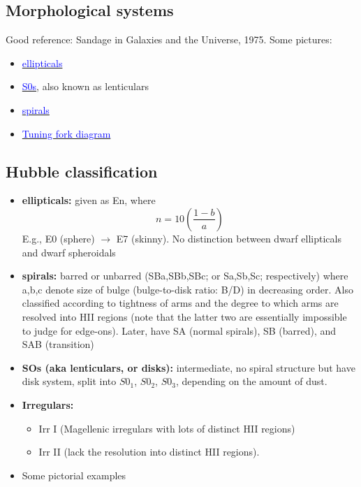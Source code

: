\documentclass{article}
\begin{document}
\subsection{Morphological systems}
Good reference: Sandage in Galaxies and the Universe, 1975.
Some pictures:
\begin{itemize}
    \item \href{http://astronomy.nmsu.edu/holtz/a555/html/diagrams/a616/ellips.htm}
        {\textcolor{blue}{ellipticals}}
    \item \href{http://astronomy.nmsu.edu/holtz/a555/html/diagrams/a616/s0.htm}
        {\textcolor{blue}{S0s}}, also known as lenticulars
    \item \href{http://astronomy.nmsu.edu/holtz/a555/html/diagrams/a616/spirals.htm}
        {\textcolor{blue}{spirals}}
    \item \href{http://astronomy.as.virginia.edu}
        {\textcolor{blue}{Tuning fork diagram}}
\end{itemize}

\subsection{Hubble classification}
\begin{itemize}
    \item \textbf{ellipticals:} given as En, where
        \[
            n = 10(\frac{1-b}{a})
        \]
        E.g., E0 (sphere) $\rightarrow$ E7 (skinny).
        No distinction between dwarf ellipticals and dwarf spheroidals
    \item \textbf{spirals:} barred or unbarred (SBa,SBb,SBc; or Sa,Sb,Sc;
        respectively)
        where a,b,c denote size of bulge (bulge-to-disk ratio: B/D)
        in decreasing order. Also classified according to tightness of
        arms and the degree to which arms are resolved into HII regions
        (note that the latter two are essentially impossible to judge
        for edge-ons).
        Later, have SA (normal spirals), SB (barred), and SAB (transition)
    \item \textbf{SOs (aka lenticulars, or disks):} intermediate, no spiral
        structure but have disk system, split into $S0_1$, $S0_2$, $S0_3$,
        depending on the amount of dust.
    \item \textbf{Irregulars:}
        \begin{itemize}
            \item Irr I (Magellenic irregulars with lots of distinct HII regions)
            \item Irr II (lack the resolution into distinct HII regions).
        \end{itemize}
    \item Some pictorial examples
\end{itemize}
\end{document}
